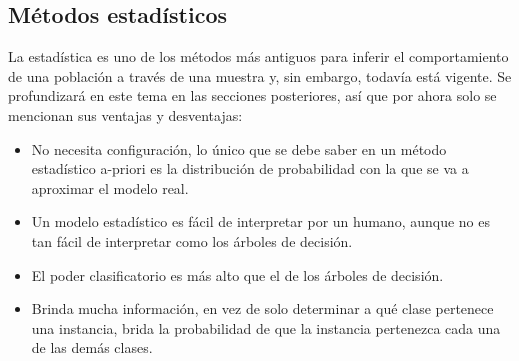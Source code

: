 \documentclass[a4paper, 11pt, oneside]{report}
\begin{document}
\subsection{Métodos estadísticos}
La estadística es uno de los métodos más antiguos para inferir el comportamiento de una población a través de una muestra y, sin embargo, todavía está vigente. Se profundizará en este tema en las secciones posteriores, así que por ahora solo se mencionan sus ventajas y desventajas:
\begin{itemize}
\item No necesita configuración, lo único que se debe saber en un método estadístico a-priori es la distribución de probabilidad con la que se va a aproximar el modelo real.
\item Un modelo estadístico es fácil de interpretar por un humano, aunque no es tan fácil de interpretar como los árboles de decisión.
\item El poder clasificatorio es más alto que el de los árboles de decisión.
\item Brinda mucha información, en vez de solo determinar a qué clase pertenece una instancia, brida la probabilidad de que la instancia pertenezca cada una de las demás clases.
\end{itemize}
\end{document}
